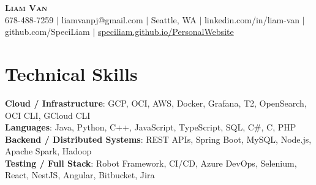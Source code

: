 \documentclass[letterpaper,11pt]{article}
\begin{document}

%
\begin{center}
    \textbf{\Huge \scshape Liam Van} \\ \vspace{1pt}
    \small 678-488-7259 $|$ \small {liamvanpj@gmail.com} $|$ Seattle, WA
 {{$|$ linkedin.com/in/liam-van} {$|$ github.com/SpeciLiam} {$|$ \href{https://speciliam.github.io/PersonalWebsite}{speciliam.github.io/PersonalWebsite}}}

\end{center}

\section{Technical Skills}
 \begin{itemize}[leftmargin=0.15in, label={}]
    \small{\item{
     \textbf{Cloud / Infrastructure}{: GCP, OCI, AWS, Docker, Grafana, T2, OpenSearch, OCI CLI, GCloud CLI} \\
     \textbf{Languages}{: Java, Python, C++, JavaScript, TypeScript, SQL, C\#, C, PHP} \\
     \textbf{Backend / Distributed Systems}{: REST APIs, Spring Boot, MySQL, Node.js, Apache Spark, Hadoop} \\
     \textbf{Testing / Full Stack}{: Robot Framework, CI/CD, Azure DevOps, Selenium, React, NestJS, Angular, Bitbucket, Jira} \\
    }}
 \end{itemize}
%
\end{document}
